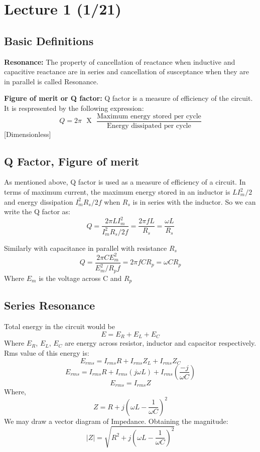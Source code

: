 
\section[Introduction (Date) --]{Lecture 1 (1/21)}

\subsection{Basic Definitions}
\textbf{Resonance:} The property of cancellation of reactance when inductive and capacitive reactance are in series and cancellation of susceptance when they are in parallel is called Resonance.

\textbf{Figure of merit or Q factor:} Q factor is a measure of efficiency of the circuit. It is respresented by the following expression:
$$Q = 2\pi \text{ } \text{X} \text{ } \frac{\text{Maximum energy stored per cycle}}{\text{Energy dissipated per cycle}}$$
[Dimensionless]

\subsection{Q Factor, Figure of merit}
As mentioned above, Q factor is used as a measure of efficiency of a circuit. In terms of maximum current,
the maximum energy stored in an inductor is ${LI_{m}^2}/{2}$ and energy dissipation $I_{m}^2R_{s}/{2f}$ when $R_{s}$ is in series with the inductor.
So we can write the Q factor as:
$$Q=\frac{2\pi LI_{m}^2}{I_{m}^2R_{s}/{2f}}=\frac{2\pi fL}{R_{s}}=\frac{\omega L}{R_{s}}$$

Similarly with capacitance in parallel with resistance $R_{s}$
$$Q=\frac{2\pi CE_{m}^2}{E_{m}^2/R_{p}f}=2\pi fCR_{p}=\omega CR_{p}$$
Where $E_{m}$ is the voltage across C and $R_{p}$

\subsection{Series Resonance}
Total energy in the circuit would be 
$$E=E_{R}+E_{L}+E_{C}$$
Where $E_{R}$, $E_{L}$, $E_{C}$ are energy across resistor, inductor and capacitor respectively.
Rms value of this energy is:
$$E_{rms}=I_{rms}R+I_{rms}Z_{L}+I_{rms}Z_{C}$$
$$E_{rms}=I_{rms}R+I_{rms}(j\omega L)+I_{rms}(\frac{-j}{\omega C})$$
$$E_{rms}=I_{rms}Z$$
Where,
$$Z=R+j(\omega L-\frac{1}{\omega C})^2$$
We may draw a vector diagram of Impedance. Obtaining the magnitude:
$$|Z|=\sqrt{R^2+j(\omega L-\frac{1}{\omega C})^2}$$

